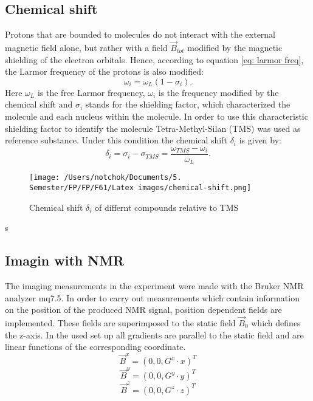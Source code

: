 \subsection{Chemical shift}
Protons that are bounded to molecules do not interact with the external magnetic field alone, but rather with a field $\vec{B}_{tot}$ modified by the magnetic shielding of the electron orbitals. Hence, according to equation \ref{eq: larmor freq}, the Larmor frequency of the protons is also modified:
\begin{equation}
\omega_i = \omega_L\left( 1 - \sigma_i\right).
\end{equation}
Here $\omega_L$ is the free Larmor frequency, $\omega_i$ is the frequency modified by the chemical shift and $\sigma_i$ stands for the shielding factor, which characterized the molecule and each nucleus within the molecule.
In order to use this characteristic shielding factor to identify  the molecule Tetra-Methyl-Silan (TMS) was used as reference substance. Under this condition the chemical shift $\delta_i$ is given by:
\begin{equation}
\delta_i = \sigma_i - \sigma_{TMS} = \frac{\omega_{TMS} - \omega_i}{\omega_L}.
\end{equation}
\begin{figure}[!htbp]
 \begin{center}
  \texttt{[image: /Users/notchok/Documents/5. Semester/FP/FP/F61/Latex images/chemical-shift.png]}
  \caption[]{Chemical shift $\delta_i$ of differnt compounds relative to TMS \footnotemark}
    \label{fig: chemical shift}
 \end{center}
\end{figure}

s\subsection{Imagin with NMR}
The imaging measurements in the experiment were made with the Bruker NMR analyzer mq7.5. 
In order to carry out measurements which contain information on the position of the produced NMR signal, position dependent fields are implemented. These fields are superimposed to the static field $\vec{B}_0$ which defines the z-axis. In the used set up all gradients are parallel to the static field and are linear functions of the corresponding coordinate.
$$\vec{B}^x = (0,0,G^x\cdot x)^T$$
$$\vec{B}^y = (0,0,G^y\cdot y)^T$$
$$\vec{B}^z = (0,0,G^z\cdot z)^T$$
